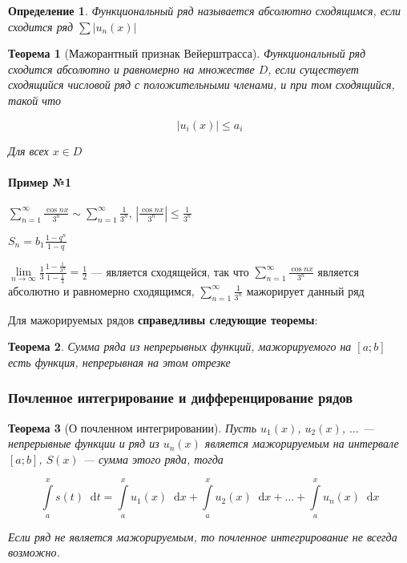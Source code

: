 \documentclass{article}
\newcommand*\diff{\mathop{}\!\mathrm{d}}
\newtheorem{definition}{Определение}
\newtheorem{theorem}{Теорема}
\begin{document}
\begin{definition}
    Функциональный ряд называется абсолютно сходящимся, если сходится ряд $\sum | u_{n} (x) |$
\end{definition}

\begin{theorem}[Мажорантный признак Вейерштрасса]
    Функциональный ряд сходится абсолютно и равномерно на множестве $D$, если существует сходящийся числовой ряд с положительными членами, и при том сходящийся, такой что

    $$
    |u_{i} (x)| \le a_{i} 
    $$

    Для всех $x \in D$
\end{theorem}

\paragraph{Пример №1}

$\sum\limits_{n = 1}^{\infty} \frac{\cos n x}{3^{n}} \sim \sum\limits_{n = 1}^{\infty} \frac{1}{3^{n}}$, $| \frac{\cos n x}{3^{n}} | \le \frac{1}{3^{n}}$

$S_{n} = b_{1} \frac{1 - q^{n}}{1 - q}$

$\lim\limits_{n \to \infty} \frac{1}{3} \frac{1 - \frac{1}{3^{n}}}{1 - \frac{1}{3}} = \frac{1}{2}$ — является сходящейся, так что $\sum\limits_{n = 1}^{\infty} \frac{\cos n x}{3^{n}}$ является абсолютно и равномерно сходящимся, $\sum\limits_{n = 1}^{\infty} \frac{1}{3^{n}}$ мажорирует данный ряд

\hfill

Для мажорируемых рядов \textbf{справедливы следующие теоремы}:

\begin{theorem}
    Сумма ряда из непрерывных функций, мажорируемого на $[a; b]$ есть функция, непрерывная на этом отрезке
\end{theorem}

\subsubsection{Почленное интегрирование и дифференцирование рядов}

\begin{theorem}[О почленном интегрировании]

Пусть $u_1 (x)$, $u_2 (x)$, $\dots$ — непрерывные функции и ряд из $u_{n} (x)$ является мажорируемым на интервале $[a; b]$, $S (x)$ — сумма этого ряда, тогда

$$
\int\limits_{a}^{x} s(t) \diff t = \int\limits_{a}^{x} u_1(x) \diff x + \int\limits_{a}^{x} u_2 (x) \diff x + \dots + \int \limits_{a}^{x} u_{n} (x) \diff x
$$

Если ряд не является мажорируемым, то почленное интегрирование не всегда возможно.

\end{theorem}
\end{document}
